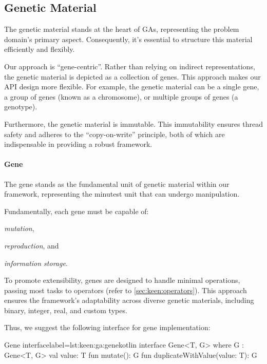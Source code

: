 \subsection{Genetic Material}
\label{sec:keen:ga:material}
  The genetic material stands at the heart of GAs, representing the problem domain's primary aspect.
  Consequently, it's essential to structure this material efficiently and flexibly.

  Our approach is \enquote{gene-centric}.
  Rather than relying on indirect representations, the genetic material is 
  depicted as a collection of genes.
  This approach makes our API design more flexible. For example, the genetic material can be a single gene, a group of genes (known as a chromosome), or multiple groups of genes (a genotype).

  Furthermore, the genetic material is immutable.
  This immutability ensures thread safety and adheres to the 
  \enquote{copy-on-write} principle, both of which are indispensable in providing a robust framework.

  \paragraph{Gene}
    The gene stands as the fundamental unit of genetic material within our 
    framework, representing the minutest unit that can undergo manipulation.

    Fundamentally, each gene must be capable of:
    \begin{enumerate*}
      \item \textit{mutation},
      \item \textit{reproduction}, and
      \item \textit{information storage}.
    \end{enumerate*}
    To promote extensibility, genes are designed to handle minimal 
    operations, passing most tasks to operators 
    (refer to \vref{sec:keen:operators}).
    This approach ensures the framework's adaptability across diverse 
    genetic materials, including binary, integer, real, and custom types.

    Thus, we suggest the following interface for gene implementation:

    \begin{code}{Gene interface}{label={lst:keen:ga:gene}}{kotlin}
      interface Gene<T, G> where G : Gene<T, G> {
          val value: T
          fun mutate(): G
          fun duplicateWithValue(value: T): G
      }
    \end{code}

